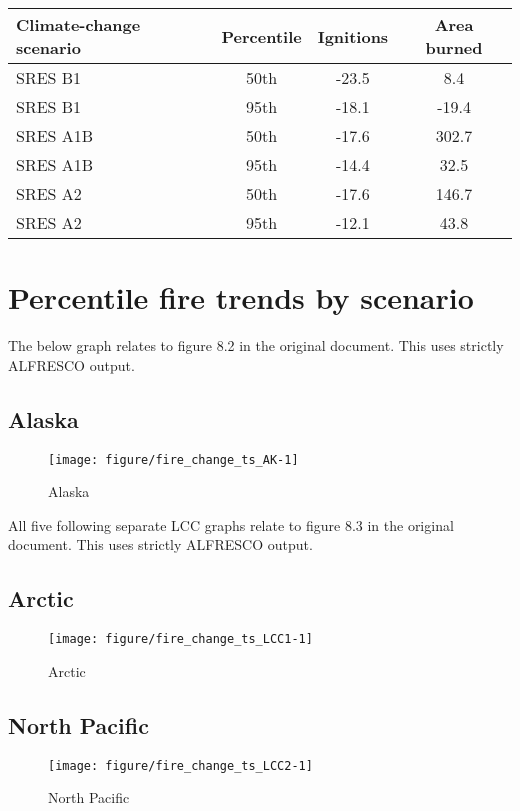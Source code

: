 \documentclass{article}\usepackage[]{graphicx}\usepackage[]{color}
\makeatletter
\def\maxwidth{ %
  \ifdim\Gin@nat@width>\linewidth
    \linewidth
  \else
    \Gin@nat@width
  \fi
}
\newcommand{\headcol}{\rowcolor{tableheadcolor}}
\makeatother
\begin{document}
\begin{table}[ht]
\centering
\begin{tabular}{lccc}
  \headcol 
 \toprule
Climate-change scenario & Percentile & Ignitions & Area burned \\ 
  \midrule
SRES B1 & 50th & -23.5 & 8.4 \\ 
  SRES B1 & 95th & -18.1 & -19.4 \\ 
  SRES A1B & 50th & -17.6 & 302.7 \\ 
  SRES A1B & 95th & -14.4 & 32.5 \\ 
  SRES A2 & 50th & -17.6 & 146.7 \\ 
  SRES A2 & 95th & -12.1 & 43.8 \\ 
   \bottomrule
\end{tabular}
\end{table}


\newpage
\section{Percentile fire trends by scenario}
The below graph relates to figure 8.2 in the original document.
This uses strictly ALFRESCO output.

\subsection{Alaska}
\begin{figure}[H]
\texttt{[image: figure/fire\_change\_ts\_AK-1]} \caption[Alaska]{Alaska\label{fig:fire_change_ts_AK}}
\end{figure}



All five following separate LCC graphs relate to figure 8.3 in the original document.
This uses strictly ALFRESCO output.

\subsection{Arctic}
\begin{figure}[H]
\texttt{[image: figure/fire\_change\_ts\_LCC1-1]} \caption[Arctic]{Arctic\label{fig:fire_change_ts_LCC1}}
\end{figure}



\subsection{North Pacific}
\begin{figure}[H]
\texttt{[image: figure/fire\_change\_ts\_LCC2-1]} \caption[North Pacific]{North Pacific\label{fig:fire_change_ts_LCC2}}
\end{figure}
\end{document}
